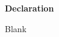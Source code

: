 \thispagestyle{empty}
\begin{center}
    \vspace*{2.5cm}
    \large
    \textbf{Declaration}
\end{center}
Blank

\clearpage
